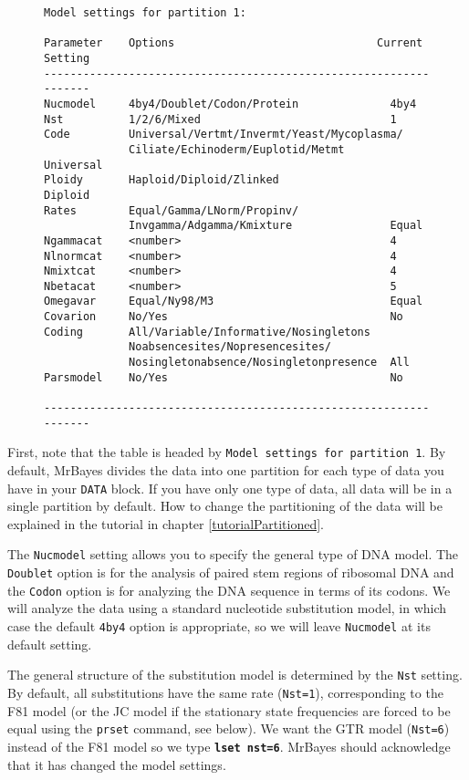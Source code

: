 \documentclass[12pt]{book}
\newcommand{\ttt}[1]{\texttt{#1}}
\newcommand{\tb}[1]{\ttt{\textbf{#1}}}
\begin{document}
\begin{figure}[h]
\centering
\begin{BVerbatim}
Model settings for partition 1:

Parameter    Options                               Current Setting
------------------------------------------------------------------
Nucmodel     4by4/Doublet/Codon/Protein              4by4
Nst          1/2/6/Mixed                             1
Code         Universal/Vertmt/Invermt/Yeast/Mycoplasma/
             Ciliate/Echinoderm/Euplotid/Metmt       Universal
Ploidy       Haploid/Diploid/Zlinked                 Diploid
Rates        Equal/Gamma/LNorm/Propinv/
             Invgamma/Adgamma/Kmixture               Equal
Ngammacat    <number>                                4
Nlnormcat    <number>                                4
Nmixtcat     <number>                                4
Nbetacat     <number>                                5
Omegavar     Equal/Ny98/M3                           Equal
Covarion     No/Yes                                  No
Coding       All/Variable/Informative/Nosingletons
             Noabsencesites/Nopresencesites/
             Nosingletonabsence/Nosingletonpresence  All
Parsmodel    No/Yes                                  No

------------------------------------------------------------------
\end{BVerbatim}
\end{figure}

First, note that the table is headed by \texttt{Model settings for partition 1}. By default,
MrBayes divides the data into one partition for each type of data you have in your \texttt{DATA}
block. If you have only one type of data, all data will be in a single partition by default. How to
change the partitioning of the data will be explained in the tutorial in chapter
\ref{tutorialPartitioned}.

The \texttt{Nucmodel} setting allows you to specify the general type of DNA model. The
\texttt{Doublet} option is for the analysis of paired stem regions of ribosomal DNA and the
\texttt{Codon} option is for analyzing the DNA sequence in terms of its codons. We will analyze the
data using a standard nucleotide substitution model, in which case the default \texttt{4by4} option
is appropriate, so we will leave \texttt{Nucmodel} at its default setting.

The general structure of the substitution model is determined by the \texttt{Nst} setting. By
default, all substitutions have the same rate (\texttt{Nst=1}), corresponding to the F81 model (or
the JC model if the stationary state frequencies are forced to be equal using the \texttt{prset}
command, see below). We want the GTR model (\texttt{Nst=6}) instead of the F81 model so we type
\tb{lset nst=6}.  MrBayes should acknowledge that it has changed the model settings.
\end{document}
